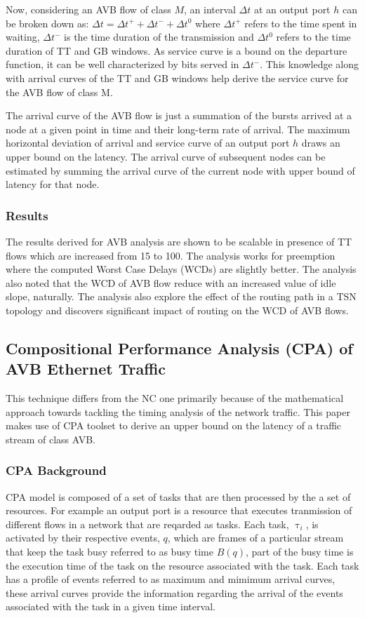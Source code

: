 \documentclass[journal,12pt,twocolumn]{IEEEtran}
\begin{document}
Now, considering an AVB flow of class $M$, an interval $\Delta t$ at an output port $h$ can be broken down as: $\Delta t =\Delta t^+ + \Delta t^- + \Delta t^0$ where $\Delta t^+$ refers to the time spent in waiting, $\Delta t^-$ is the time duration of the transmission and $\Delta t^0$ refers to the time duration of TT and GB windows. As service curve is a bound on the departure function, it can be well characterized by bits served in $\Delta t^-$. This knowledge along with arrival curves of the TT and GB windows help derive the service curve for the AVB flow of class M.

The arrival curve of the AVB flow is just a summation of the bursts arrived at a node at a given point in time and their long-term rate of arrival.
The maximum horizontal deviation of arrival and service curve of an output port $h$ draws an upper bound on the latency. The arrival curve of subsequent nodes can be estimated by summing the arrival curve of the current node with upper bound of latency for that node.
\subsubsection{Results}
The results derived for AVB analysis are shown to be scalable in presence of TT flows which are increased from 15 to 100. The analysis works for preemption where the computed Worst Case Delays (WCDs) are slightly better. The analysis also noted that the WCD of AVB flow reduce with an increased value of idle slope, naturally. The analysis also explore the effect of the routing path in a TSN topology and discovers significant impact of routing on the WCD of AVB flows.

\subsection {Compositional Performance Analysis (CPA) of AVB Ethernet Traffic}
This technique \cite{CPA} differs from the NC one primarily because of the mathematical approach towards tackling the timing analysis of the network traffic. This paper makes use of CPA toolset to derive an upper bound on the latency of a traffic stream of class AVB.
\subsubsection{CPA Background}
CPA model is composed of a set of tasks that are then processed by the a set of resources. For example an output port is a resource that executes tranmission of different flows in a network that are reqarded as tasks. Each task, $\uptau_i$,  is activated by their respective events, $q$, which are frames of a particular stream that keep the task busy referred to as busy time $B(q)$, part of the busy time is the execution time of the task on the resource associated with the task. Each task has a profile of events referred to as maximum and mimimum arrival curves, these arrival curves provide the information regarding the arrival of the events associated with the task in a given time interval.
\end{document}
